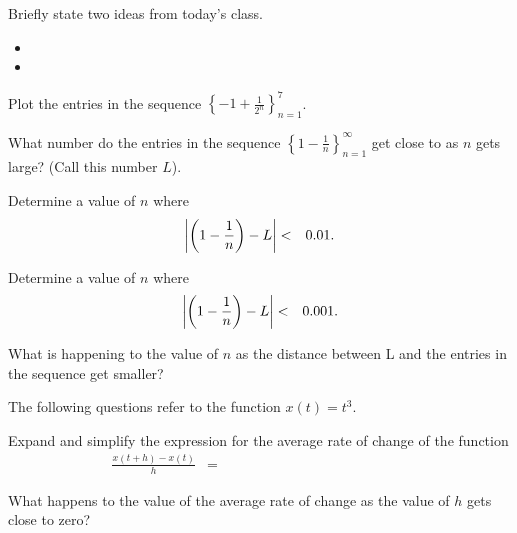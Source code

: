 \begin{problem}
\item Briefly state two ideas from today's class.
  \begin{itemize}
  \item 
  \item 
  \end{itemize}
    \item Plot the entries in the sequence $\left\{ -1+\frac{1}{2^n}\right\}_{n=1}^7$.

      \scalebox{0.7}{}
      
      \begin{subproblem}
        
      \item What number do the entries in the sequence
        $\left\{ 1-\frac{1}{n}\right\}_{n=1}^\infty$ get close to as $n$
        gets large?  (Call this number $L$).

      \item Determine a value of $n$ where 
        \begin{eqnarray*}
          \left| \left( 1-\frac{1}{n} \right) - L \right| & < & 0.01.
        \end{eqnarray*}

        \vfill

      \item Determine a value of $n$ where 
        \begin{eqnarray*}
          \left| \left( 1-\frac{1}{n}\right) - L \right| & < & 0.001.
        \end{eqnarray*}

        \vfill

      \item What is happening to the value of $n$ as the distance
        between L and the entries in the sequence get smaller?

        \vspace{3em}

      \end{subproblem}


  \clearpage
  \item The following questions refer to the function $x(t)=t^3$.
    \begin{subproblem}
    \item Expand and simplify the expression for the average rate of
      change of the function
      \begin{eqnarray*}
        \frac{x(t+h)-x(t)}{h} & = & ~~~~~~~~~~~~~~~~~~~~~~~~~~~~~~~~~~~~~~~~~~~~~~~~~~~~~~~~~~
      \end{eqnarray*}
      \vspace{3em}
    \item What happens to the value of the average rate of change as
      the value of $h$ gets close to zero?
      \vspace{3em}
    \end{subproblem}


\end{problem}
